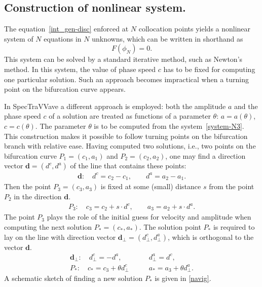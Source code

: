 
\subsection{Construction of nonlinear system.}

%
The equation~\eqref{int_gen-disc} enforced at $N$ collocation points 
yields a nonlinear system of $N$ equations in $N$ unknowns, which can be written in shorthand as  
	\begin{equation*}
		F(\phi_N) = 0.
	\end{equation*}
This system can be solved by a standard iterative method, such as Newton's method. 
	In this system, the value of phase speed $c$ has to be fixed for computing one particular solution. 
	Such an approach becomes impractical when a turning point on the bifurcation curve appears. 
	
	In \textsf{SpecTraVVave} a different approach is employed: both the amplitude $a$ and the phase speed $c$ of a solution are treated as functions of a parameter $\theta$: $ a = a(\theta)$, $c = c(\theta)$. The parameter $\theta$ is to be computed from the system~\eqref{system-N3}. This construction makes it possible to follow turning points
on the bifurcation branch with relative ease.
	Having computed two solutions, i.e., two points on the bifurcation curve $P_1 = (c_1, a_1)$ and $P_2 = (c_2, a_2)$, one may find a direction vector $\mathbf{d}=(d^c, d^a)$ of the line that contains these points:
	\begin{align*}
		\mathbf{d}:	\quad d^c = c_2 - c_1, \qquad	d^a = a_2-a_1.
	\end{align*}
	Then the point $P_3 = (c_3,a_3)$ is fixed at some (small) distance $s$ from the point $P_2$ in the direction $\mathbf{d}$.
	\begin{align*}
		P_3: \quad c_3 = c_2 + s \cdot d^c, \qquad	a_3 = a_2 + s \cdot d^a.
	\end{align*}
	 The point $P_3$ plays the role of the initial guess for velocity and amplitude when computing the next solution $P_\ast = (c_\ast, a_\ast)$. 
	The solution point $P_\ast$ is required to lay on the line with direction vector $\mathbf{d_{\bot}}=(d^c_{\bot}, d^a_{\bot})$, which is orthogonal to the vector $\mathbf{d}$.
	\begin{align*}
	\mathbf{d_{\bot}}: \quad d^c_{\bot} = - d^a, \qquad &d^a_{\bot} = d^c,  \\
	P_\ast: \quad c_\ast = c_3 + \theta d^c_{\bot} \qquad &a_\ast = a_3 + \theta d^a_{\bot}.
	\end{align*}
	 A schematic sketch of finding a new solution $P_\ast$ is given in \autoref{navig}.	
	
